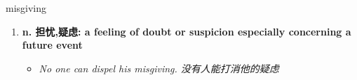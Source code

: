 
\begin{frame}
{\huge misgiving}
\begin{center}
\begin{enumerate}\Large
  \item \textbf{n. 担忧,疑虑: a feeling of doubt or suspicion especially concerning a future event}
  \begin{itemize}
    \item \em{\Large{No one can dispel his misgiving. 没有人能打消他的疑虑}}
  \end{itemize}
\end{enumerate}
\end{center}
\end{frame}
